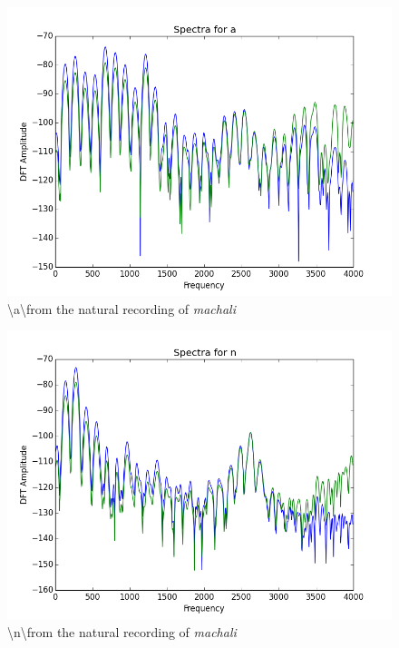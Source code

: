 \documentclass[a4paper]{article}
\begin{document}
\begin{figure}[h!]
    \includegraphics[width=\linewidth]{./images/spectra_a.png}
    \caption{ \textbackslash a\textbackslash from the natural recording of \textit{machali}}
    \label{fig:1}
\end{figure}


\begin{figure}[h!]
    \includegraphics[width=\linewidth]{./images/spectra_n.png}
    \caption{ \textbackslash n\textbackslash from the natural recording of \textit{machali}}
    \label{fig:1}
\end{figure}
\end{document}
